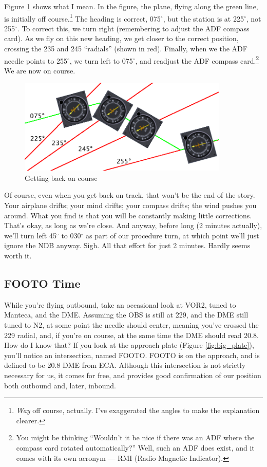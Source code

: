 Figure \ref{fig:NDB_flying} shows what I mean.  In the figure, the
plane, flying along the green line, is initially off
course.\footnote{\emph{Way} off course, actually.  I've exaggerated
  the angles to make the explanation clearer.}  The heading is
correct, 075$^\circ$, but the station is at 225$^\circ$, not
255$^\circ$.  To correct this, we turn right (remembering to adjust
the ADF compass card).  As we fly on this new heading, we get closer
to the correct position, crossing the 235 and 245 ``radials'' (shown
in red).  Finally, when we the ADF needle points to 255$^\circ$, we
turn left to 075$^\circ$, and readjust the ADF compass
card.\footnote{You might be thinking ``Wouldn't it be nice if there
  was an ADF where the compass card rotated automatically?''  Well,
  such an ADF does exist, and it comes with its own acronym --- RMI
  (Radio Magnetic Indicator).} We are now on course.

\begin{figure}
  \begin{center}
    \includegraphics[width=10cm]{img/NDB_flying}
    \caption{Getting back on course}
    \label{fig:NDB_flying}
  \end{center}
\end{figure}

Of course, even when you get back on track, that won't be the end of
the story.  Your airplane drifts; your mind drifts; your compass
drifts; the wind pushes you around.  What you find is that you will be
constantly making little corrections.  That's okay, as long as we're
close.  And anyway, before long (2 minutes actually), we'll turn left
45$^\circ$ to 030$^\circ$ as part of our procedure turn, at which
point we'll just ignore the NDB anyway.  Sigh.  All that effort for
just 2 minutes.  Hardly seems worth it.

\subsection{FOOTO Time}

While you're flying outbound, take an occasional look at VOR2, tuned
to Manteca, and the DME.  Assuming the OBS is still at 229, and the
DME still tuned to N2, at some point the needle should center, meaning
you've crossed the 229 radial, and, if you're on course, at the same
time the DME should read 20.8.  How do I know that?  If you look at
the approach plate (Figure \ref{fig:big_plate}), you'll notice an
intersection, named FOOTO.  FOOTO is on the approach, and is defined
to be 20.8 DME from ECA.  Although this intersection is not strictly
necessary for us, it comes for free, and provides good confirmation of
our position both outbound and, later, inbound.

